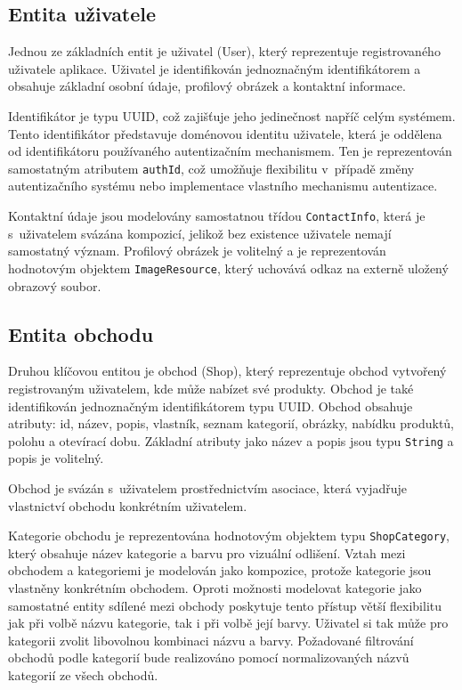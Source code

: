 \subsection{Entita uživatele}
Jednou ze základních entit je uživatel (User), který reprezentuje registrovaného uživatele aplikace.
Uživatel je identifikován jednoznačným identifikátorem a obsahuje základní osobní údaje, profilový obrázek a kontaktní informace.

Identifikátor je typu UUID, což zajišťuje jeho jedinečnost napříč celým systémem.
Tento identifikátor představuje doménovou identitu uživatele, která je oddělena od identifikátoru používaného autentizačním mechanismem.
Ten je reprezentován samostatným atributem \texttt{auth\-Id}, což umožňuje flexibilitu v~případě změny autentizačního systému nebo implementace vlastního mechanismu autentizace.

Kontaktní údaje jsou modelovány samostatnou třídou \texttt{Contact\-Info}, která je s~uživatelem svázána kompozicí, jelikož bez existence uživatele nemají samostatný význam.
Profilový obrázek je volitelný a je reprezentován hodnotovým objektem \texttt{Image\-Resource}, který uchovává odkaz na externě uložený obrazový soubor.

\subsection{Entita obchodu}
Druhou klíčovou entitou je obchod (Shop), který reprezentuje obchod vytvořený registrovaným uživatelem, kde může nabízet své produkty.
Obchod je také identifikován jednoznačným identifikátorem typu UUID\@.
Obchod obsahuje atributy: id, název, popis, vlastník, seznam kategorií, obrázky, nabídku produktů, polohu a otevírací dobu.
Základní atributy jako název a popis jsou typu \texttt{String} a popis je volitelný.

Obchod je svázán s~uživatelem prostřednictvím asociace, která vyjadřuje vlastnictví obchodu konkrétním uživatelem.

Kategorie obchodu je reprezentována hodnotovým objektem typu \texttt{Shop\-Category}, který obsahuje název kategorie a barvu pro vizuální odlišení.
Vztah mezi obchodem a kategoriemi je modelován jako kompozice, protože kategorie jsou vlastněny konkrétním obchodem.
Oproti možnosti modelovat kategorie jako samostatné entity sdílené mezi obchody poskytuje tento přístup větší flexibilitu jak při volbě názvu kategorie, tak i při volbě její barvy.
Uživatel si tak může pro kategorii zvolit libovolnou kombinaci názvu a barvy.
Požadované filtrování obchodů podle kategorií bude realizováno pomocí normalizovaných názvů kategorií ze všech obchodů.


